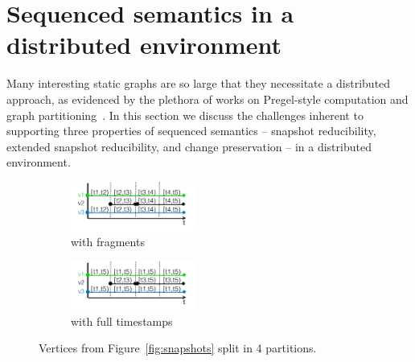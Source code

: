 \section{Sequenced semantics in a \\ distributed environment}
\label{sec:consider}


Many interesting static graphs are so large that they necessitate a
distributed approach, as evidenced by the plethora of works on
Pregel-style computation and graph partitioning~\cite{McCune2015}.
  In
this section we discuss the challenges inherent to supporting three
properties of sequenced semantics -- snapshot reducibility, extended
snapshot reducibility, and change preservation -- in a distributed
environment.



\begin{figure}
\begin{subfigure}[b]{1.6in}
\includegraphics[width=1.6in]{figs/split.pdf}
\caption{with fragments}
\vspace{-0.2cm}
\label{fig:split}
\end{subfigure}
\begin{subfigure}[b]{1.6in}
\includegraphics[width=1.6in]{figs/split2.pdf}
\caption{with full timestamps}
\vspace{-0.2cm}
\label{fig:split2}
\end{subfigure}
\caption{Vertices from Figure~\ref{fig:snapshots} split in 4 partitions.}
\vspace{-0.5cm}
\end{figure}

